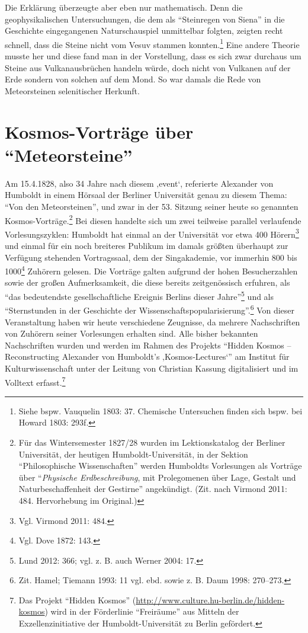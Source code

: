 Die Erklärung überzeugte aber eben nur mathematisch. Denn die
geophysika\-lischen Untersuchungen, die dem als \enquote{Steinregen von
Siena} in die Geschichte eingegangenen Naturschauspiel unmittelbar
folgten, zeigten recht schnell, dass die Steine nicht vom Vesuv stammen
konnten.\footnote{Siehe bspw. Vauquelin 1803: 37. Chemische Untersuchen
  finden sich bspw. bei Howard 1803: 293f.} Eine andere Theorie musste
her und diese fand man in der Vorstellung, dass es sich zwar durchaus um
Steine aus Vulkanausbrüchen handeln würde, doch nicht von Vulkanen auf
der Erde sondern von solchen auf dem Mond. So war damals die Rede von
Meteorsteinen selenitischer Herkunft.

\section*{\texorpdfstring{Kosmos-Vorträge über
\enquote{Meteorsteine}}{Kosmos-Vorträge über Meteorsteine}}\label{kosmos-vortruxe4ge-uxfcber-meteorsteine}

Am 15.4.1828, also 34 Jahre nach diesem ‚event`, referierte Alexander
von Humboldt in einem Hörsaal der Berliner Universität genau zu diesem
Thema: \enquote{Von den Meteorsteinen}, und zwar in der 53. Sitzung
seiner heute so genannten Kos\-mos-Vorträge.\footnote{Für das
  Wintersemester 1827/28 wurden im Lektionskatalog der Berliner
  Universität, der heutigen Humboldt-Universität, in der Sektion
  \enquote{Philosophische Wissenschaften} werden Humboldts Vorlesungen
  als Vorträge über \enquote{\emph{Physische Erdbeschreibung}, mit
  Prolegomenen über Lage, Gestalt und Naturbeschaffenheit der Gestirne}
  angekündigt. (Zit. nach Virmond 2011: 484. Hervorhebung im Original.)}
Bei diesen handelte sich um zwei teilweise parallel verlaufende
Vorlesungszyklen: Humboldt hat einmal an der Universität vor etwa 400
Hörern\footnote{Vgl. Virmond 2011: 484.} und einmal für ein noch
breiteres Publikum im damals größten überhaupt zur Verfügung stehenden
Vortragssaal, dem der Singakademie, vor immerhin 800 bis 1000\footnote{Vgl.
  Dove 1872: 143.} Zuhörern gelesen. Die Vorträge galten aufgrund der
hohen Besucherzahlen sowie der großen Aufmerksamkeit, die diese bereits
zeitgenössisch erfuhren, als \enquote{das bedeutendste gesellschaftliche
Ereignis Berlins dieser Jahre}\footnote{Lund 2012: 366; vgl. z. B. auch
  Werner 2004: 17.} und als \enquote{Sternstunden in der Geschichte der
Wissenschaftspopularisierung}.\footnote{Zit. Hamel; Tiemann 1993: 11
  vgl. ebd. sowie z. B. Daum 1998: 270--273.} Von dieser Veranstaltung
haben wir heute verschiedene Zeugnisse, da mehrere Nachschriften von
Zuhörern seiner Vorlesungen erhalten sind. Alle bisher bekannten
Nachschriften wurden und werden im Rahmen des Projekts \enquote{Hidden
Kosmos -- Reconstructing Alexander von Humboldt's ‚Kosmos-Lectures`} am
Institut für Kulturwissenschaft unter der Leitung von Christian Kassung
digitalisiert und im Volltext erfasst.\footnote{Das Projekt
  \enquote{Hidden Kosmos}
  (\url{http://www.culture.hu-berlin.de/hidden-kosmos}) wird in der
  Förderlinie \enquote{Freiräume} aus Mitteln der Exzellenzinitiative
  der Humboldt-Universität zu Berlin gefördert.}

